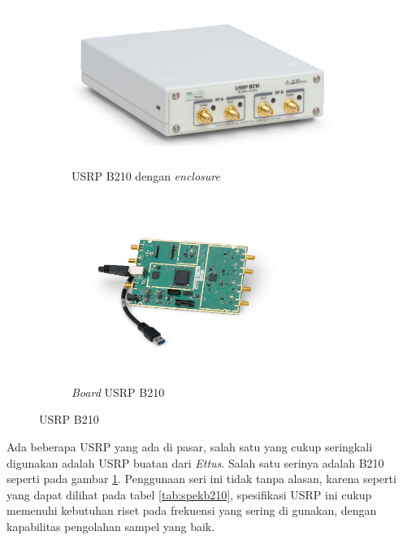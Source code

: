 \begin{center}
	\begin{figure}[h!]
		\begin{subfigure}[b]{0.5\linewidth}
			\includegraphics[width=\linewidth]{pics/bab2/B210.jpg}
			\caption{USRP B210 dengan \textit{enclosure}}
		\end{subfigure}
		\begin{subfigure}[b]{0.5\linewidth}
			\includegraphics[width=7.3cm]{pics/bab2/B210Board.jpg}
			\caption{\textit{Board} USRP B210}
		\end{subfigure}
		\caption{USRP B210}
		\label{pic:gambarusrp}
	\end{figure}
\end{center}

Ada beberapa USRP yang ada di pasar, salah satu yang cukup seringkali digunakan adalah USRP buatan dari \textit{Ettus}. Salah satu serinya adalah B210 seperti pada gambar \ref{pic:gambarusrp}. Penggunaan seri ini tidak tanpa alasan, karena seperti yang dapat dilihat pada tabel \ref{tab:spekb210}, spesifikasi USRP ini cukup memenuhi kebutuhan riset pada frekuensi yang sering di gunakan, dengan kapabilitas pengolahan sampel yang baik.

